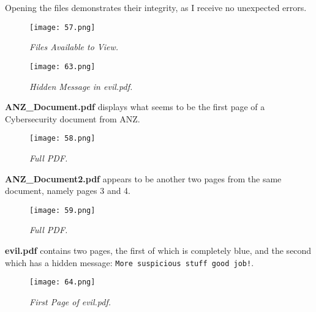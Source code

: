 Opening the files demonstrates their integrity, as I receive no unexpected errors. 

\begin{figure}[H]
    \setlength{\abovecaptionskip}{20pt}
    \setlength{\belowcaptionskip}{0pt}
    \centering
    \texttt{[image: 57.png]}
    \captionsetup{justification=centering}
    \caption{\textit{Files Available to View.}}
    \label{fig:57}
\end{figure}
\vspace{-10pt}

\begin{figure}[H]
    \setlength{\abovecaptionskip}{20pt}
    \setlength{\belowcaptionskip}{0pt}
    \centering
    \texttt{[image: 63.png]}
    \captionsetup{justification=centering}
    \caption{\textit{Hidden Message in evil.pdf.}}
    \label{fig:63}
\end{figure}
\vspace{-10pt}

\textbf{ANZ\_Document.pdf} displays what seems to be the first page of a Cybersecurity document from ANZ. 

\begin{figure}[H]
    \setlength{\abovecaptionskip}{20pt}
    \setlength{\belowcaptionskip}{0pt}
    \centering
    \texttt{[image: 58.png]}
    \captionsetup{justification=centering}
    \caption{\textit{Full PDF.}}
    \label{fig:58}
\end{figure}
\vspace{-10pt}

\textbf{ANZ\_Document2.pdf} appears to be another two pages from the same document, namely pages 3 and 4.

\begin{figure}[H]
    \setlength{\abovecaptionskip}{20pt}
    \setlength{\belowcaptionskip}{0pt}
    \centering
    \texttt{[image: 59.png]}
    \captionsetup{justification=centering}
    \caption{\textit{Full PDF.}}
    \label{fig:59}
\end{figure}
\vspace{-10pt}

\textbf{evil.pdf} contains two pages, the first of which is completely blue, and the second which has a hidden message: \texttt{More suspicious stuff good job!}.

\begin{figure}[H]
    \setlength{\abovecaptionskip}{20pt}
    \setlength{\belowcaptionskip}{0pt}
    \centering
    \texttt{[image: 64.png]}
    \captionsetup{justification=centering}
    \caption{\textit{First Page of evil.pdf.}}
    \label{fig:64}
\end{figure}
\vspace{-10pt}

